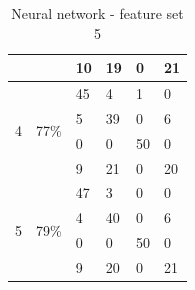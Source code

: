\documentclass[USenglish]{ifimaster}  %
\begin{document}
\begin{table}[h]
\begin{tabular}{@{}llllll@{}}
		\multicolumn{1}{l|}{} & \multicolumn{1}{l|}{} & \multicolumn{1}{l|}{10} & \multicolumn{1}{l|}{19} & \multicolumn{1}{l|}{0} & 21 \\ \midrule
		\multicolumn{1}{l|}{\multirow{4}{*}{4}} & \multicolumn{1}{l|}{\multirow{4}{*}{77\%}} & \multicolumn{1}{l|}{45} & \multicolumn{1}{l|}{4} & \multicolumn{1}{l|}{1} & 0 \\ \cmidrule(l){3-6} 
		\multicolumn{1}{l|}{} & \multicolumn{1}{l|}{} & \multicolumn{1}{l|}{5} & \multicolumn{1}{l|}{39} & \multicolumn{1}{l|}{0} & 6 \\ \cmidrule(l){3-6} 
		\multicolumn{1}{l|}{} & \multicolumn{1}{l|}{} & \multicolumn{1}{l|}{0} & \multicolumn{1}{l|}{0} & \multicolumn{1}{l|}{50} & 0 \\ \cmidrule(l){3-6} 
		\multicolumn{1}{l|}{} & \multicolumn{1}{l|}{} & \multicolumn{1}{l|}{9} & \multicolumn{1}{l|}{21} & \multicolumn{1}{l|}{0} & 20 \\ \midrule
		\multicolumn{1}{l|}{\multirow{4}{*}{5}} & \multicolumn{1}{l|}{\multirow{4}{*}{79\%}} & \multicolumn{1}{l|}{47} & \multicolumn{1}{l|}{3} & \multicolumn{1}{l|}{0} & 0 \\ \cmidrule(l){3-6} 
		\multicolumn{1}{l|}{} & \multicolumn{1}{l|}{} & \multicolumn{1}{l|}{4} & \multicolumn{1}{l|}{40} & \multicolumn{1}{l|}{0} & 6 \\ \cmidrule(l){3-6} 
		\multicolumn{1}{l|}{} & \multicolumn{1}{l|}{} & \multicolumn{1}{l|}{0} & \multicolumn{1}{l|}{0} & \multicolumn{1}{l|}{50} & 0 \\ \cmidrule(l){3-6} 
		\multicolumn{1}{l|}{} & \multicolumn{1}{l|}{} & \multicolumn{1}{l|}{9} & \multicolumn{1}{l|}{20} & \multicolumn{1}{l|}{0} & 21 \\ \bottomrule
	\end{tabular}
	\caption{Neural network - feature set 5}
	\label{nnset5}
\end{table}
\FloatBarrier
\end{document}
